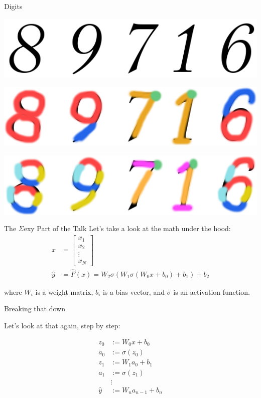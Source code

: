 \documentclass[11pt]{beamer}
\begin{document}
\begin{frame}{Digits}
\begin{center}

\includegraphics[scale=0.5]{digits}

\pause

\includegraphics[scale=0.5]{digits2}

\pause

\includegraphics[scale=0.5]{digits3}
\end{center}
\end{frame}

\begin{frame}{The $\Sigma$exy Part of the Talk}
Let's take a look at the math under the hood:
\begin{align*}
x &= \left[\begin{array}{c}
x_1 \\
x_2 \\
\vdots \\
x_N
\end{array}\right] \\
\widehat{y} &= \widehat{F}(x) = W_2\sigma(W_1\sigma(W_0x + b_0) + b_1) + b_2
\end{align*}

where $W_i$ is a weight matrix, $b_i $ is a bias vector, and $\sigma$ is an activation function.
\end{frame}

\begin{frame}{Breaking that down}

Let's look at that again, step by step:

\begin{align*}
z_0 &:= W_0x + b_0 \\
a_0 &:= \sigma(z_0) \\
z_1 &:= W_1a_0 + b_1 \\
a_1 &:= \sigma(z_1) \\
&\vdots \\
\widehat{y} &:= W_n a_{n-1} + b_n
\end{align*}

\end{frame}
\end{document}
